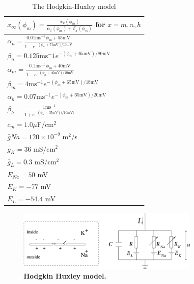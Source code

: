 \begin{table}[h!]
\begin{center}
\caption{The Hodgkin-Huxley model}
\label{tab:HH}
    \begin{tabular}{l}
    \hline
    $x_{\infty}(\phi_m) = \frac{\alpha_x(\phi_m)}{\alpha_x(\phi_m) + \beta_x(\phi_m)}$ for $x = m,n,h$ \\ \hline
    $ \alpha_n = \frac{0.01 \mathrm{ms}^{-1} \phi_m+55 \mathrm{mV}}{1-e^{-(\phi_m+55 \mathrm{mV})/10 \mathrm{mV}}}$  \\ \hline
    $ \beta_n = 0.125 \mathrm{ms}^-1 e^{-(\phi_m+65 \mathrm{mV})/80 \mathrm{mV}} $  \\ \hline
    $ \alpha_m = \frac{0.1 \mathrm{ms}^{-1} \phi_m+ 40 \mathrm{mV}} {1-e^{-(\phi_m+40 \mathrm{mV})/10 \mathrm{mV}}}$  \\ \hline
    $\beta_m = 4 \mathrm{ms}^{-1} e^{-(\phi_m+65  \mathrm{mV})/18 \mathrm{mV}} $  \\ \hline
    $\alpha_h = 0.07 \mathrm{ms}^{-1} e^{-(\phi_m+65 \mathrm{mV})/20 \mathrm{mV}}$  \\ \hline
    $\beta_h = \frac{1 \mathrm{ms}^{-1}}{1+e^{-(\phi_m+35 \mathrm{mV}))/10 \mathrm{mV})}} $  \\ \hline
    $c_m = 1.0 \mu $F/cm$^2$ \\ \hline
    $\bar{g}{Na} = 120\times 10^{-9}$ m$^2$/s\\ \hline
    $\bar{g}_{K} = 36$ mS/cm$^2$ \\ \hline
    $\bar{g}_{L} = 0.3$ mS/cm$^2$ \\ \hline
    $E_{Na} = 50$ mV \\ \hline
    $E_{K} = -77$ mV \\ \hline
    $E_{L} = -54.4$ mV \\ \hline
    \end{tabular}
\end{center}
\end{table}

\begin{figure}[!ht]
\begin{center}
\includegraphics[width=0.8\textwidth]{Fig02/HHmodel.png}
\end{center}
\caption{\textbf{Hodgkin Huxley model.}
}
\label{fig:HHcircuit}
\end{figure}


